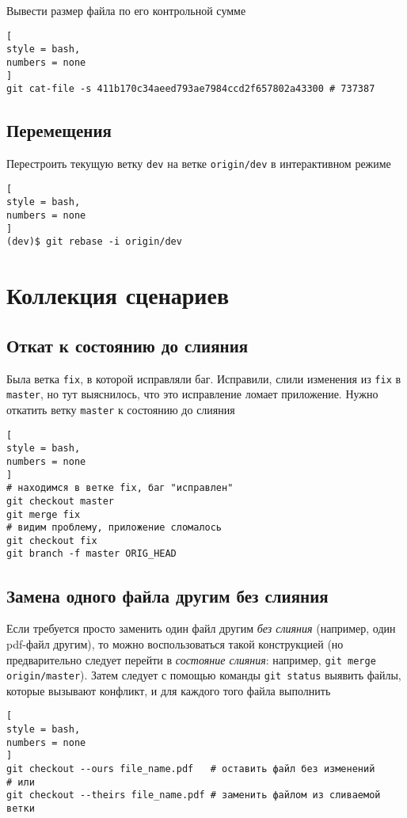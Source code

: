 \documentclass[%
	11pt,
	a4paper,
	utf8,
		]{article}
\begin{document}
Вывести размер файла по его контрольной сумме
\begin{lstlisting}[
style = bash,
numbers = none
]
git cat-file -s 411b170c34aeed793ae7984ccd2f657802a43300 # 737387
\end{lstlisting}

\subsection{Перемещения}

Перестроить текущую ветку \texttt{dev} на ветке \texttt{origin/dev} в интерактивном режиме
\begin{lstlisting}[
style = bash,
numbers = none
]
(dev)$ git rebase -i origin/dev
\end{lstlisting}

\section{Коллекция сценариев}

\subsection{Откат к состоянию до слияния}

Была ветка \texttt{fix}, в которой исправляли баг. Исправили, слили изменения из \texttt{fix} в \texttt{master}, но тут выяснилось, что это исправление ломает приложение. Нужно откатить ветку \texttt{master} к состоянию до слияния
\begin{lstlisting}[
style = bash,
numbers = none
]
# находимся в ветке fix, баг "исправлен"
git checkout master
git merge fix
# видим проблему, приложение сломалось
git checkout fix
git branch -f master ORIG_HEAD
\end{lstlisting}

\subsection{Замена одного файла другим без слияния}

Если требуется просто заменить один файл другим \emph{без слияния} (например, один pdf-файл другим), то можно воспользоваться такой конструкцией (но предварительно следует перейти в \emph{состояние слияния}: например, \verb|git merge origin/master|). Затем следует с помощью команды \texttt{git status} выявить файлы, которые вызывают конфликт, и для каждого того файла выполнить
\begin{lstlisting}[
style = bash,
numbers = none	
]
git checkout --ours file_name.pdf   # оставить файл без изменений
# или
git checkout --theirs file_name.pdf # заменить файлом из сливаемой ветки
\end{lstlisting}
\end{document}
